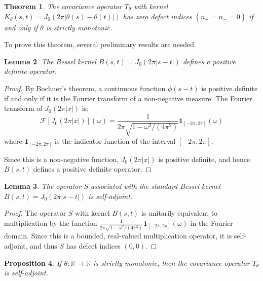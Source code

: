 \documentclass{article}
\newtheorem{theorem}{Theorem}
\newtheorem{lemma}[theorem]{Lemma}
\newtheorem{proposition}[theorem]{Proposition}
\begin{document}
\begin{theorem}\label{thm:main}
The covariance operator $T_\theta$ with kernel $K_\theta(s,t) = J_0(2\pi|\theta(s) - \theta(t)|)$ has zero defect indices $(n_+ = n_- = 0)$ if and only if $\theta$ is strictly monotonic.
\end{theorem}

To prove this theorem, several preliminary results are needed.

\begin{lemma}\label{lemma:bessel-pd}
The Bessel kernel $B(s,t) = J_0(2\pi|s-t|)$ defines a positive definite operator.
\end{lemma}

\begin{proof}
By Bochner's theorem, a continuous function $\phi(s-t)$ is positive definite if and only if it is the Fourier transform of a non-negative measure. The Fourier transform of $J_0(2\pi|x|)$ is:
\begin{equation}
    \mathcal{F}[J_0(2\pi|x|)](\omega) = \frac{1}{2\pi\sqrt{1-\omega^2/(4\pi^2)}}\mathbf{1}_{[-2\pi,2\pi]}(\omega)
\end{equation}
where $\mathbf{1}_{[-2\pi,2\pi]}$ is the indicator function of the interval $[-2\pi,2\pi]$.

Since this is a non-negative function, $J_0(2\pi|x|)$ is positive definite, and hence $B(s,t)$ defines a positive definite operator.
\end{proof}

\begin{lemma}\label{lemma:standard-sa}
The operator $S$ associated with the standard Bessel kernel $B(s,t) = J_0(2\pi|s-t|)$ is self-adjoint.
\end{lemma}

\begin{proof}
The operator $S$ with kernel $B(s,t)$ is unitarily equivalent to multiplication by the function $\frac{1}{2\pi\sqrt{1-\omega^2/(4\pi^2)}}\mathbf{1}_{[-2\pi,2\pi]}(\omega)$ in the Fourier domain. Since this is a bounded, real-valued multiplication operator, it is self-adjoint, and thus $S$ has defect indices $(0,0)$.
\end{proof}

\begin{proposition}\label{prop:monotonic-implies-sa}
If $\theta: \mathbb{R} \to \mathbb{R}$ is strictly monotonic, then the covariance operator $T_\theta$ is self-adjoint.
\end{proposition}
\end{document}
